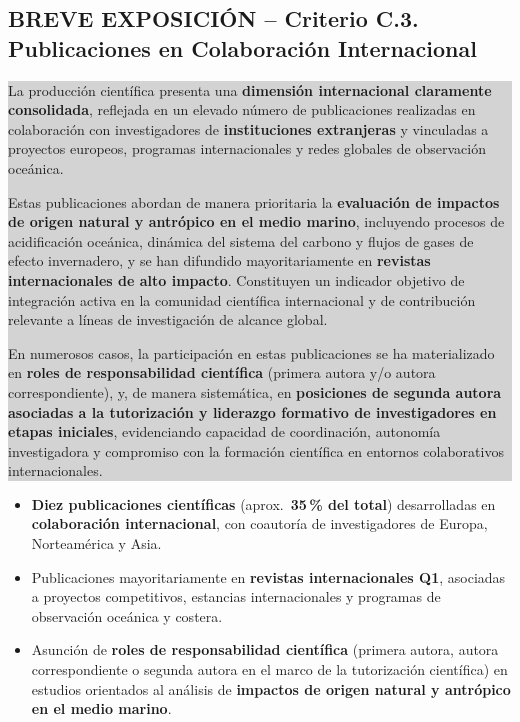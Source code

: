 \documentclass[11pt,a4paper]{article}
\newcommand{\breveexposicion}[2]{
    \subsection*{\color{darkgray}\textbf{BREVE EXPOSICIÓN -- #1}}
    \vspace{0.3em}
    \noindent\colorbox{lightgray}{%
        \begin{minipage}{0.97\textwidth}
        \vspace{0.5em}
        \color{darkgray}
        #2
        \vspace{0.5em}
        \end{minipage}
    }
    \vspace{1em}
}
\begin{document}
\breveexposicion{Criterio C.3. Publicaciones en Colaboración Internacional}{
La producción científica presenta una \textbf{dimensión internacional claramente consolidada}, reflejada en un elevado número de publicaciones realizadas en colaboración con investigadores de \textbf{instituciones extranjeras} y vinculadas a proyectos europeos, programas internacionales y redes globales de observación oceánica.

Estas publicaciones abordan de manera prioritaria la \textbf{evaluación de impactos de origen natural y antrópico en el medio marino}, incluyendo procesos de acidificación oceánica, dinámica del sistema del carbono y flujos de gases de efecto invernadero, y se han difundido mayoritariamente en \textbf{revistas internacionales de alto impacto}. Constituyen un indicador objetivo de integración activa en la comunidad científica internacional y de contribución relevante a líneas de investigación de alcance global.

En numerosos casos, la participación en estas publicaciones se ha materializado en \textbf{roles de responsabilidad científica} (primera autora y/o autora correspondiente), y, de manera sistemática, en \textbf{posiciones de segunda autora asociadas a la tutorización y liderazgo formativo de investigadores en etapas iniciales}, evidenciando capacidad de coordinación, autonomía investigadora y compromiso con la formación científica en entornos colaborativos internacionales.
}

\begin{itemize}[leftmargin=*]
    \item \textbf{Diez publicaciones científicas} (aprox.\ \textbf{35\,\% del total}) desarrolladas en \textbf{colaboración internacional}, con coautoría de investigadores de Europa, Norteamérica y Asia.

    \item Publicaciones mayoritariamente en \textbf{revistas internacionales Q1}, asociadas a proyectos competitivos, estancias internacionales y programas de observación oceánica y costera.

    \item Asunción de \textbf{roles de responsabilidad científica} (primera autora, autora correspondiente o segunda autora en el marco de la tutorización científica) en estudios orientados al análisis de \textbf{impactos de origen natural y antrópico en el medio marino}.
\end{itemize}


\newpage
\end{document}
